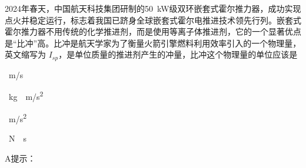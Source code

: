 2024年春天，中国航天科技集团研制的\qty{50}{kW}级双环嵌套式霍尔推力器，成功实现点火并稳定运行，标志着我国已跻身全球嵌套式霍尔电推进技术领先行列。嵌套式霍尔推力器不用传统的化学推进剂，而是使用等离子体推进剂，它的一个显著优点是“比冲”高。比冲是航天学家为了衡量火箭引擎燃料利用效率引入的一个物理量，英文缩写为 $I_{sp}$，是单位质量的推进剂产生的冲量，比冲这个物理量的单位应该是\paren[]
\begin{choices}
	\item \qty{}{m/s}
	\item \qty{}{kg\cdot m/s^2}
	\item \qty{}{m/s^2}
	\item \qty{}{N\cdot s}
\end{choices}
\begin{answer}
    A\qquad 提示：
\end{answer}